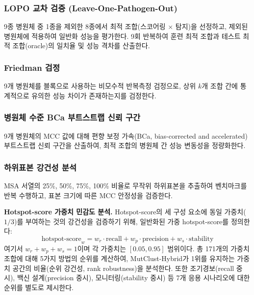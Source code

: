 \subsubsection{LOPO 교차 검증 (Leave-One-Pathogen-Out)}

9종 병원체 중 1종을 제외한 8종에서 최적 조합(스코어링 $\times$ 탐지)을 선정하고, 제외된 병원체에 적용하여 일반화 성능을 평가한다.
9회 반복하여 훈련 최적 조합과 테스트 최적 조합(oracle)의 일치율 및 성능 격차를 산출한다.

\subsubsection{Friedman 검정}

9개 병원체를 블록으로 사용하는 비모수적 반복측정 검정으로, 상위 $k$개 조합 간에 통계적으로 유의한 성능 차이가 존재하는지를 검정한다.

\subsubsection{병원체 수준 BCa 부트스트랩 신뢰 구간}

9개 병원체의 MCC 값에 대해 편향 보정 가속(BCa, bias-corrected and accelerated) 부트스트랩 신뢰 구간을 산출하여, 최적 조합의 병원체 간 성능 변동성을 정량화한다.

\subsubsection{하위표본 강건성 분석}

MSA 서열의 25\%, 50\%, 75\%, 100\% 비율로 무작위 하위표본을 추출하여 벤치마크를 반복 수행하고, 표본 크기에 따른 MCC 안정성을 검증한다.

\textbf{Hotspot-score 가중치 민감도 분석.}
\label{subsec:weight_sensitivity_methods}
Hotspot-score의 세 구성 요소에 동일 가중치($1/3$)를 부여하는 것의 강건성을 검증하기 위해, 일반화된 가중 hotspot-score를 정의한다:
\begin{equation}
\text{hotspot-score}_w = w_r \cdot \text{recall} + w_p \cdot \text{precision} + w_s \cdot \text{stability}
\label{eq:weighted_hotspot_score}
\end{equation}
여기서 $w_r + w_p + w_s = 1$이며 각 가중치는 $[0.05, 0.95]$ 범위이다.
총 171개의 가중치 조합에 대해 5가지 방법의 순위를 계산하여, MutClust-Hybrid가 1위를 유지하는 가중치 공간의 비율(순위 강건성, rank robustness)을 분석한다.
또한 조기경보(recall 중시), 백신 설계(precision 중시), 모니터링(stability 중시) 등 7개 응용 시나리오에 대한 순위를 별도로 제시한다.

